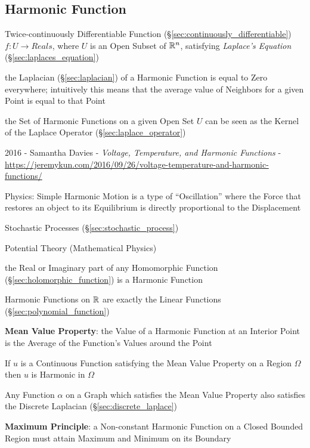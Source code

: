 \subsection{Harmonic Function}\label{sec:harmonic_function}

Twice-continuously Differentiable Function
(\S\ref{sec:continuously_differentiable}) $f : U \rightarrow Reals$,
where $U$ is an Open Subset of $\mathbb{R}^n$, satisfying \emph{Laplace's
  Equation} (\S\ref{sec:laplaces_equation})

the Laplacian (\S\ref{sec:laplacian}) of a Harmonic Function is equal to Zero
everywhere; intuitively this means that the average value of Neighbors for a
given Point is equal to that Point

the Set of Harmonic Functions on a given Open Set $U$ can be seen as the Kernel
of the Laplace Operator (\S\ref{sec:laplace_operator})

2016 - Samantha Davies - \emph{Voltage, Temperature, and Harmonic
  Functions} -
\url{https://jeremykun.com/2016/09/26/voltage-temperature-and-harmonic-functions/}

Physics: Simple Harmonic Motion is a type of ``Oscillation'' where the
Force that restores an object to its Equilibrium is directly
proportional to the Displacement

Stochastic Processes (\S\ref{sec:stochastic_process})

Potential Theory (Mathematical Physics) %

the Real or Imaginary part of any Homomorphic Function
(\S\ref{sec:holomorphic_function}) is a Harmonic Function

Harmonic Functions on $\mathbb{R}$ are exactly the Linear Functions
(\S\ref{sec:polynomial_function})


\textbf{Mean Value Property}: the Value of a Harmonic Function at an
Interior Point is the Average of the Function's Values around the
Point

If $u$ is a Continuous Function satisfying the Mean Value Property on
a Region $\Omega$ then $u$ is Harmonic in $\Omega$

Any Function $\alpha$ on a Graph which satisfies the Mean Value
Property also satisfies the Discrete Laplacian
(\S\ref{sec:discrete_laplace})


\textbf{Maximum Principle}: a Non-constant Harmonic Function on a
Closed Bounded Region must attain Maximum and Minimum on its Boundary

